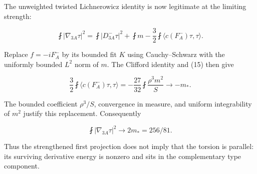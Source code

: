 \documentclass[11pt]{article}
\begin{document}
The unweighted twisted Lichnerowicz identity is now legitimate at the
limiting strength:

\[
 \fint|\nabla_{3A}\tau|^2
 =\fint|D^-_{3A}\tau|^2+\fint m
       -\frac32\fint\langle c(F_A^-)\tau,\tau\rangle.
\]

Replace \(f=-iF_A^-\) by its bounded fit \(K\) using Cauchy--Schwarz
with the uniformly bounded \(L^2\) norm of \(m\). The Clifford identity
and (15) then give

\[
 \frac32\fint\langle c(F_A^-)\tau,\tau\rangle
 =-\frac{27}{32}\fint\frac{\rho^3m^2}{S}
 \longrightarrow-m_*.
\]

The bounded coefficient \(\rho^3/S\), convergence in measure, and
uniform integrability of \(m^2\) justify this replacement. Consequently

\[
 \boxed{\fint|\nabla_{3A}\tau|^2\longrightarrow
              2m_* =256/81.}\tag{25}
\]

Thus the strengthened first projection does not imply that the torsion
is parallel: its surviving derivative energy is nonzero and sits in the
complementary type component.
\end{document}

